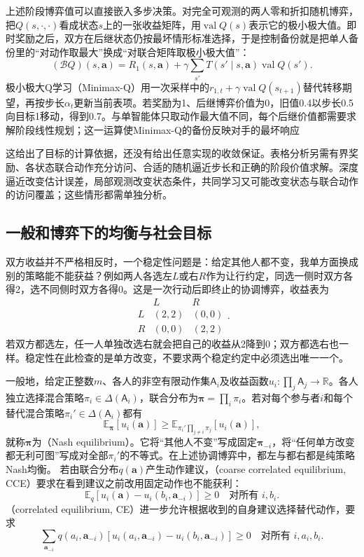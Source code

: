 上述阶段博弈值可以直接嵌入多步决策。对完全可观测的两人零和折扣随机博弈，把$Q(s,\cdot,\cdot)$看成状态$s$上的一张收益矩阵，用$\operatorname{val}Q(s)$表示它的极小极大值。即时奖励之后，双方在后继状态仍按最坏情形标准选择，于是控制备份就是把单人备份里的“对动作取最大”换成“对联合矩阵取极小极大值”：
\begin{equation}
 (\mathcal B Q)(s,\bm a)
 =R_1(s,\bm a)+\gamma\sum_{s'}T(s'\mid s,\bm a)
           \operatorname{val}Q(s').
 \label{eq:rl-multi-agent-minimax-backup}
\end{equation}
极小极大Q学习（Minimax-Q）用一次采样中的$r_{1,t}+\gamma\operatorname{val}Q(s_{t+1})$替代转移期望，再按步长$\alpha_t$更新当前表项。若奖励为1、后继博弈价值为0，旧值0.4以步长0.5向目标1移动，得到0.7。与单智能体只取动作最大值不同，每个后继价值都需要求解阶段线性规划；这一运算使Minimax-Q的备份反映对手的最坏响应

这给出了目标的计算依据，还没有给出任意实现的收敛保证。表格分析另需有界奖励、各状态联合动作充分访问、合适的随机逼近步长和正确的阶段价值求解。深度逼近改变估计误差，局部观测改变状态条件，共同学习又可能改变状态与联合动作的访问覆盖；这些情形都需单独分析。

\subsection{一般和博弈下的均衡与社会目标}
\label{sec:rl-multi-agent-equilibria}

双方收益并不严格相反时，一个稳定性问题是：给定其他人都不变，我单方面换成别的策略能不能获益？例如两人各选左$L$或右$R$作为让行约定，同选一侧时双方各得2，选不同侧时双方各得0。这是一次行动后即终止的协调博弈，收益表为
\[
 \begin{array}{c|cc}
       &L&R\\ \hline
 L&(2,2)&(0,0)\\
 R&(0,0)&(2,2)
 \end{array}.
\]
若双方都选左，任一人单独改选右就会把自己的收益从2降到0；双方都选右也一样。稳定性在此检查的是单方改变，不要求两个稳定约定中必须选出唯一一个。

一般地，给定正整数$m$、各人的非空有限动作集$\mathsf A_i$及收益函数$u_i:\prod_j\mathsf A_j\to\mathbb R$。各人独立选择混合策略$\pi_i\in\Delta(\mathsf A_i)$，联合分布为$\bm\pi=\prod_i\pi_i$。若对每个参与者$i$和每个替代混合策略$\pi_i'\in\Delta(\mathsf A_i)$都有
\[
 \mathbb E_{\bm\pi}[u_i(\bm a)]
 \geq \mathbb E_{\pi_i'\prod_{j\ne i}\pi_j}[u_i(\bm a)],
\]
就称$\bm\pi$为（Nash equilibrium）。它将“其他人不变”写成固定$\bm\pi_{-i}$，将“任何单方改变都无利可图”写成对全部$\pi_i'$的不等式。在上述协调博弈中，都左与都右都是纯策略Nash均衡。
若由联合分布$q(\bm a)$产生动作建议，（coarse correlated equilibrium, CCE）要求在看到建议之前改用固定动作也不能获利：
\[
 \mathbb E_q[u_i(\bm a)-u_i(b_i,\bm a_{-i})]\geq0
 \quad\text{对所有 }i,b_i.
\]
（correlated equilibrium, CE）进一步允许根据收到的自身建议选择替代动作，要求
\[
 \sum_{\bm a_{-i}}q(a_i,\bm a_{-i})
 [u_i(a_i,\bm a_{-i})-u_i(b_i,\bm a_{-i})]\geq0
 \quad\text{对所有 }i,a_i,b_i.
\]

